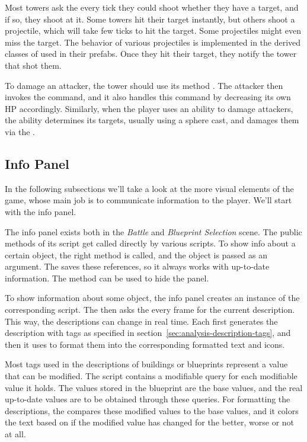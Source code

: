 Most towers ask the  every tick they could shoot whether they have a target, and if so, they shoot at it.
Some towers hit their target instantly, but others shoot a projectile, which will take few ticks to hit the target.
Some projectiles might even miss the target.
The behavior of various projectiles is implemented in the derived classes of  used in their prefabs.
Once they hit their target, they notify the tower that shot them.

To damage an attacker, the tower should use its method .
The attacker then invokes the  command, and it also handles this command by decreasing its own HP accordingly.
Similarly, when the player uses an ability to damage attackers, the ability determines its targets, usually using a sphere cast, and damages them via the .

\subsection{Info Panel}\label{sec:docs-info-panel}

In the following subsections we'll take a look at the more visual elements of the game, whose main job is to communicate information to the player.
We'll start with the info panel.

The info panel exists both in the \emph{Battle} and \emph{Blueprint Selection} scene.
The public methods of its  script get called directly by various scripts.
To show info about a certain object, the right method is called, and the object is passed as an argument.
The  saves these references, so it always works with up-to-date information.
The  method can be used to hide the panel.

To show information about some object, the info panel creates an instance of the corresponding  script.
The  then asks the  every frame for the current description.
This way, the descriptions can change in real time.
Each  first generates the description with tags as specified in section~\ref{sec:analysis-description-tags}, and then it uses  to format them into the corresponding formatted text and icons.

Most tags used in the descriptions of buildings or blueprints represent a value that can be modified.
The  script contains a modifiable query for each modifiable value it holds.
The values stored in the blueprint are the base values, and the real up-to-date values are to be obtained through these queries.
For formatting the descriptions, the  compares these modified values to the base values, and it colors the text based on if the modified value has changed for the better, worse or not at all.

